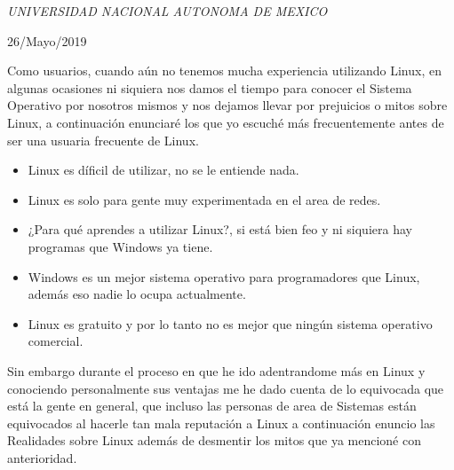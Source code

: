 \documentclass[a4paper, 11pt, oneside]{article}
\begin{document}
\begin{titlepage}
	\textit{UNIVERSIDAD NACIONAL AUTONOMA DE MEXICO} 
	
	\vfill
	
	
	
	
	\vspace{0.3\baselineskip} 
	
	26/Mayo/2019 
	
	

\end{titlepage}
Como usuarios, cuando aún no tenemos mucha experiencia utilizando Linux, en algunas ocasiones ni siquiera nos damos el tiempo para conocer el Sistema Operativo por nosotros mismos y nos dejamos llevar por prejuicios o mitos sobre Linux, a continuación enunciaré los que yo escuché más frecuentemente antes de ser una usuaria frecuente de Linux.
\begin{itemize}
    \item Linux es díficil de utilizar, no se le entiende nada.
    \item Linux es solo para gente muy experimentada en el area de redes.
    \item ¿Para qué aprendes a utilizar Linux?, si está bien feo y ni siquiera hay programas que Windows ya tiene.
    \item Windows es un mejor sistema operativo para programadores que Linux, además eso nadie lo ocupa actualmente.
    \item Linux es gratuito y por lo tanto no es mejor que ningún sistema operativo comercial.
\end{itemize}
Sin embargo durante el proceso en que he ido adentrandome más en Linux y conociendo personalmente sus ventajas me he dado cuenta de lo equivocada que está la gente en general, que incluso las personas de area de Sistemas están equivocados al hacerle tan mala reputación a Linux a continuación enuncio las Realidades sobre Linux además de desmentir los mitos que ya mencioné con anterioridad.
\end{document}
